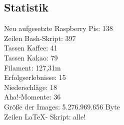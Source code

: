 \subsection{Statistik}\label{fz_statistik}
Neu aufgesetzte Raspberry Pis: 138\\
Zeilen Bash-Skript: 397\\
Tassen Kaffee: 41\\
Tassen Kakao: 79\\
Filament: 127,31m\\
Erfolgserlebnisse: 15\\
Niederschläge: 18\\
Aha!-Momente: 36\\
Größe der Images: 5.276.969.656 Byte\\
Zeilen \LaTeX - Skript: alle!\\ 